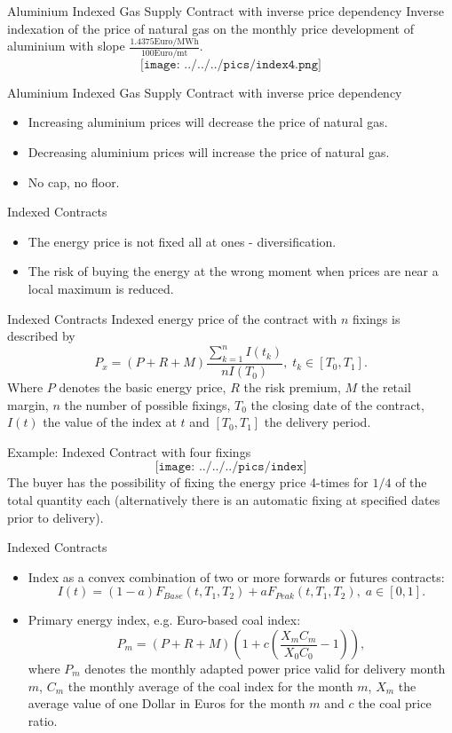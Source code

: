 {Aluminium Indexed Gas Supply Contract with inverse price dependency}
Inverse indexation of the price of natural gas on the monthly price development of aluminium with slope $\frac{1.4375\text{Euro/MWh}}{100\text{Euro/mt}}$.
$$\texttt{[image: ../../../pics/index4.png]}$$

{Aluminium Indexed Gas Supply Contract with inverse price dependency}
\begin{itemize}
  \item<1-> Increasing aluminium prices will decrease the price of natural gas.
  \item<2-> Decreasing aluminium prices will increase the price of natural gas.
  \item<3-> No cap, no floor.
\end{itemize}

{Indexed Contracts}
\begin{itemize}
  \item The energy price is not fixed all at ones - diversification.
  \item The risk of buying the energy at the wrong moment when prices are near a local maximum is reduced.
\end{itemize}

{Indexed Contracts}
Indexed energy price of the contract with $n$ fixings is described by
$$P_x=(P+R+M)\frac{\sum_{k=1}^n{I(t_k)}}{nI(T_0)},\;t_k\in[T_0,T_1].$$
Where $P$ denotes the basic energy price, $R$ the risk premium, $M$ the retail margin, $n$ the number of possible fixings,
$T_0$ the closing date of the contract, $I(t)$ the value of the index at $t$ and $[T_0,T_1]$ the delivery period.

{Example: Indexed Contract with four fixings}
$$\texttt{[image: ../../../pics/index]}$$
The buyer has the possibility of fixing the energy price 4-times for $1/4$ of the total quantity each (alternatively there is an automatic fixing at specified dates prior to delivery).

{Indexed Contracts}
\begin{itemize}
  \item<1-> Index as a convex combination of two or more forwards or futures contracts:
  $$I(t)=(1-a)F_{Base}(t,T_1,T_2)+aF_{Peak}(t,T_1,T_2),\;a\in[0,1].$$
  \item<2-> Primary energy index, e.g. Euro-based coal index:
  $$P_m=(P+R+M)\left(1+c\left(\frac{X_mC_m}{X_0C_0}-1\right)\right),$$
  where $P_m$ denotes the monthly adapted power price valid for delivery month $m$, $C_m$ the monthly average of the coal index for the month $m$, $X_m$ the average value of one Dollar in Euros for the month $m$ and $c$ the coal price ratio.
\end{itemize}

